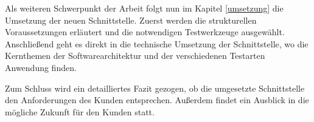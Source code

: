 Als weiteren Schwerpunkt der Arbeit folgt nun im Kapitel \ref{umsetzung} die Umsetzung der neuen Schnittstelle. Zuerst werden die strukturellen Voraussetzungen erläutert und die notwendigen Testwerkzeuge ausgewählt. Anschließend geht es direkt in die technische Umsetzung der Schnittstelle, wo die Kernthemen der Softwarearchitektur und der verschiedenen Testarten Anwendung finden.

Zum Schluss wird ein detailliertes Fazit gezogen, ob die umgesetzte Schnittstelle den Anforderungen des Kunden entsprechen. Außerdem findet ein Ausblick in die mögliche Zukunft für den Kunden statt.




